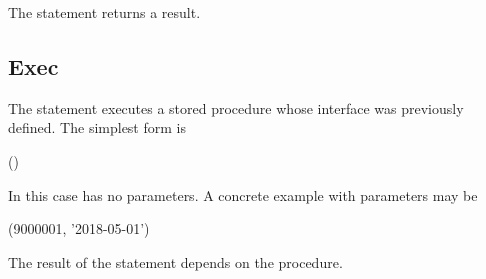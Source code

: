 The statement returns a  result.

\subsection{Exec}
The  statement executes a stored procedure
whose interface was previously defined.
The simplest form is

 ()

In this case  has no parameters.
A concrete example with parameters may be

 (9000001, '2018-05-01')

The result of the statement depends on the procedure.

